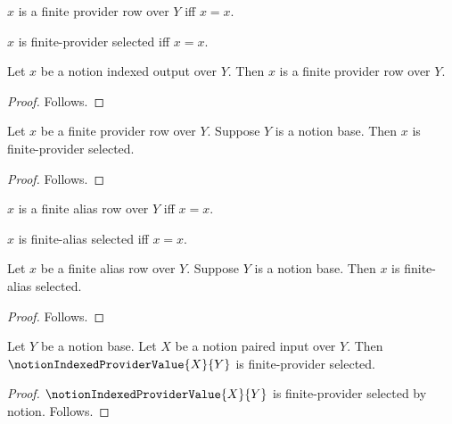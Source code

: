 

\begin{definition}\label{notion_finite_provider_row}
    $x$ is a finite provider row over $Y$ iff $x=x$.
\end{definition}

\begin{definition}\label{notion_finite_provider_selected}
    $x$ is finite-provider selected iff $x=x$.
\end{definition}

\begin{classification}\label{notion_indexed_output_is_finite_provider_row}
    Let $x$ be a notion indexed output over $Y$.
    Then $x$ is a finite provider row over $Y$.
\end{classification}
\begin{proof}
    Follows.
\end{proof}

\begin{classification}\label{notion_finite_provider_row_is_selected}
    Let $x$ be a finite provider row over $Y$.
    Suppose $Y$ is a notion base.
    Then $x$ is finite-provider selected.
\end{classification}
\begin{proof}
    Follows.
\end{proof}

\begin{definition}\label{notion_finite_alias_row}
    $x$ is a finite alias row over $Y$ iff $x=x$.
\end{definition}

\begin{definition}\label{notion_finite_alias_selected}
    $x$ is finite-alias selected iff $x=x$.
\end{definition}

\begin{classification}\label{notion_finite_alias_row_is_selected}
    Let $x$ be a finite alias row over $Y$.
    Suppose $Y$ is a notion base.
    Then $x$ is finite-alias selected.
\end{classification}
\begin{proof}
    Follows.
\end{proof}

\begin{proposition}\label{notion_finite_provider_offer}
    Let $Y$ be a notion base.
    Let $X$ be a notion paired input over $Y$.
    Then $\notionIndexedProviderValue{X}{Y}$ is finite-provider selected.
\end{proposition}
\begin{proof}
    $\notionIndexedProviderValue{X}{Y}$ is finite-provider selected by notion.
    Follows.
\end{proof}


